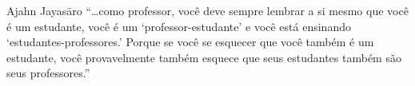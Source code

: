 
\begin{quotepage}{0.6\linewidth}{Ajahn Jayasāro}
“\ldots{}como professor, você deve sempre lembrar a si mesmo que você é um
estudante, você é um ‘professor-estudante’ e você está ensinando
‘estudantes-professores.’ Porque se você se esquecer que você também é
um estudante, você provavelmente também esquece que seus estudantes
também são seus professores.”
\end{quotepage}

